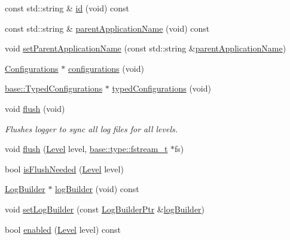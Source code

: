 \begin{DoxyCompactItemize}
const std\+::string \& \hyperlink{classel_1_1_logger_ae51a621df3c835f51f450134ba66f8ac}{id} (void) const 
\item 
const std\+::string \& \hyperlink{classel_1_1_logger_a9e56e468bccd7b52281e7bbc75892431}{parent\+Application\+Name} (void) const 
\item 
void \hyperlink{classel_1_1_logger_a6890af8910adba26b01ef029429c4f15}{set\+Parent\+Application\+Name} (const std\+::string \&\hyperlink{classel_1_1_logger_a9e56e468bccd7b52281e7bbc75892431}{parent\+Application\+Name})
\item 
\hyperlink{classel_1_1_configurations}{Configurations} $\ast$ \hyperlink{classel_1_1_logger_aeb57aeaddbb3dcd0cb96114019817142}{configurations} (void)
\item 
\hyperlink{classel_1_1base_1_1_typed_configurations}{base\+::\+Typed\+Configurations} $\ast$ \hyperlink{classel_1_1_logger_ac1d34e77892ea506b011d5279b6b139d}{typed\+Configurations} (void)
\item 
void \hyperlink{classel_1_1_logger_a9a89d454008b1ee1a197eec4b92ce22a}{flush} (void)
\begin{DoxyCompactList}\small\item\em Flushes logger to sync all log files for all levels. \end{DoxyCompactList}\item 
void \hyperlink{classel_1_1_logger_a83c85278ebeeef6a24cc112e56c344dd}{flush} (\hyperlink{namespaceel_ab0ac6091262344c52dd2d3ad099e8e36}{Level} level, \hyperlink{namespaceel_1_1base_1_1type_a620c830ead75d26b45c060c211ee2685}{base\+::type\+::fstream\+\_\+t} $\ast$fs)
\item 
bool \hyperlink{classel_1_1_logger_abdf56c00388c71d1cbaa7e2df4449202}{is\+Flush\+Needed} (\hyperlink{namespaceel_ab0ac6091262344c52dd2d3ad099e8e36}{Level} level)
\item 
\hyperlink{classel_1_1_log_builder}{Log\+Builder} $\ast$ \hyperlink{classel_1_1_logger_aead5b130c5141d2024740b03ab4b45d7}{log\+Builder} (void) const 
\item 
void \hyperlink{classel_1_1_logger_a737340322cc9d9d20febd7131c1e262f}{set\+Log\+Builder} (const \hyperlink{namespaceel_ad4c4b2f7d70a4b02568a9f70724a6b39}{Log\+Builder\+Ptr} \&\hyperlink{classel_1_1_logger_aead5b130c5141d2024740b03ab4b45d7}{log\+Builder})
\item 
bool \hyperlink{classel_1_1_logger_a5abaca24ac28bfd4806bea32be193435}{enabled} (\hyperlink{namespaceel_ab0ac6091262344c52dd2d3ad099e8e36}{Level} level) const 
\end{DoxyCompactItemize}
